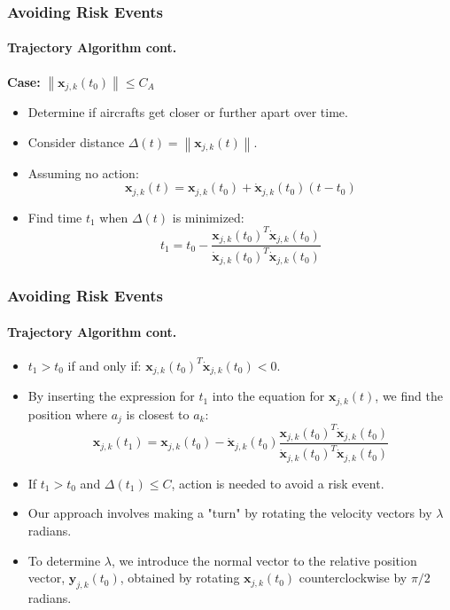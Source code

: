\documentclass[UKenglish]{beamer}
\begin{document}
\begin{frame}
\frametitle{Avoiding Risk Events}
\framesubtitle{Trajectory Algorithm cont.}
\textbf{Case:} \(\left\| \boldsymbol{x}_{j, k} (t_0) \right\| \leq C_A\)
\begin{itemize}
    \item Determine if aircrafts get closer or further apart over time.
    \item Consider distance \(\Delta(t) = \left\| \boldsymbol{x}_{j, k}(t) \right\|\).
    \item Assuming no action:
    \[ \boldsymbol{x}_{j, k}(t) = \boldsymbol{x}_{j, k}(t_0) + \dot{\boldsymbol{x}}_{j, k}(t_0)(t - t_0) \]
    \item Find time \(t_1\) when \(\Delta(t)\) is minimized:
    \[ t_1 = t_0 - \frac{\boldsymbol{x}_{j, k}(t_0)^T \dot{\boldsymbol{x}}_{j, k}(t_0)}{\dot{\boldsymbol{x}}_{j, k}(t_0)^T \dot{\boldsymbol{x}}_{j, k}(t_0)} \]
\end{itemize}
\end{frame}
\begin{frame}
\frametitle{Avoiding Risk Events}
\framesubtitle{Trajectory Algorithm cont.}
\begin{itemize}
    \item \( t_1 > t_0 \) if and only if: \( \boldsymbol{x}_{j, k}(t_0)^T \dot{\boldsymbol{x}}_{j, k}(t_0) < 0 \).
    \item By inserting the expression for \( t_1 \) into the equation for $\boldsymbol{x}_{j, k}(t)$, we find the position where \( a_j \) is closest to \( a_k \):
    \[ \boldsymbol{x}_{j, k}(t_1) = \boldsymbol{x}_{j, k}(t_0) - \dot{\boldsymbol{x}}_{j, k}(t_0) \frac{\boldsymbol{x}_{j, k}(t_0)^T \dot{\boldsymbol{x}}_{j, k}(t_0)}{\dot{\boldsymbol{x}}_{j, k}(t_0)^T \dot{\boldsymbol{x}}_{j, k}(t_0)} \]
    \item If \( t_1 > t_0 \) and \( \Delta(t_1) \leq C \), action is needed to avoid a risk event.
    \item Our approach involves making a "turn" by rotating the velocity vectors by \( \lambda \) radians.
    \item To determine \( \lambda \), we introduce the normal vector to the relative position vector, \( \boldsymbol{y}_{j,k}(t_0) \), obtained by rotating \( \boldsymbol{x}_{j,k}(t_0) \) counterclockwise by \( \pi/2 \) radians.
\end{itemize}
\end{frame}
\end{document}
